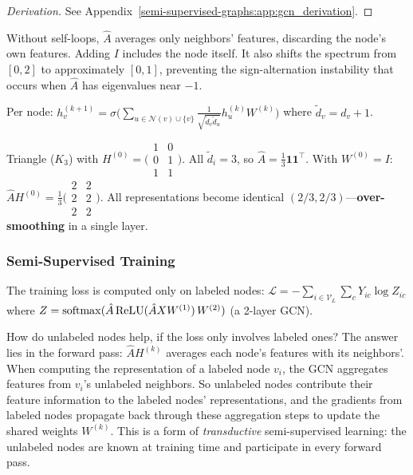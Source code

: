 \begin{notechapter}
\begin{proof}[Derivation]
See Appendix~\ref{semi-supervised-graphs:app:gcn_derivation}.
\end{proof}

\begin{remark}[Why add self-loops ($\tilde{A} = A + I$)]
Without self-loops, $\hat{A}$ averages only neighbors' features, discarding
the node's own features. Adding $I$ includes the node itself. It also shifts
the spectrum from $[0,2]$ to approximately $[0,1]$, preventing the
sign-alternation instability that occurs when $\hat{A}$ has eigenvalues near
$-1$.
\end{remark}

Per node:
$h_v^{(k+1)} = \sigma\!\bigl(\sum_{u \in \mathcal{N}(v) \cup \{v\}}
\frac{1}{\sqrt{\tilde{d}_v\tilde{d}_u}}h_u^{(k)}W^{(k)}\bigr)$ where
$\tilde{d}_v = d_v + 1$.

\begin{numericalexample}[title=One GCN Layer on a Triangle]
Triangle ($K_3$) with $H^{(0)} = \bigl(\begin{smallmatrix}1&0\\0&1\\1&1
\end{smallmatrix}\bigr)$. All $\tilde{d}_i = 3$, so $\hat{A} = \frac{1}{3}
\mathbf{1}\mathbf{1}^\top$. With $W^{(0)}=I$:
$\hat{A}H^{(0)} = \frac{1}{3}\bigl(\begin{smallmatrix}2&2\\2&2\\2&2
\end{smallmatrix}\bigr)$. All representations become identical
$(2/3,2/3)$---\textbf{over-smoothing} in a single layer.
\end{numericalexample}

\subsubsection{Semi-Supervised Training}

The training loss is computed only on labeled nodes:
$\mathcal{L} = -\sum_{i \in \mathcal{V}_L}\sum_c Y_{ic}\log Z_{ic}$
where $Z = \operatorname{softmax}(\hat{A}\,\text{ReLU}(\hat{A}XW^{(1)})\,W^{(2)})$
(a 2-layer GCN).

How do unlabeled nodes help, if the loss only involves labeled ones? The
answer lies in the forward pass: $\hat{A}H^{(k)}$ averages each node's features
with its neighbors'. When computing the representation of a labeled node $v_i$,
the GCN aggregates features from $v_i$'s unlabeled neighbors. So unlabeled
nodes contribute their feature information to the labeled nodes' representations,
and the gradients from labeled nodes propagate back through these aggregation
steps to update the shared weights $W^{(k)}$. This is a form of
\emph{transductive} semi-supervised learning: the unlabeled nodes are known at
training time and participate in every forward pass.


\end{notechapter}
